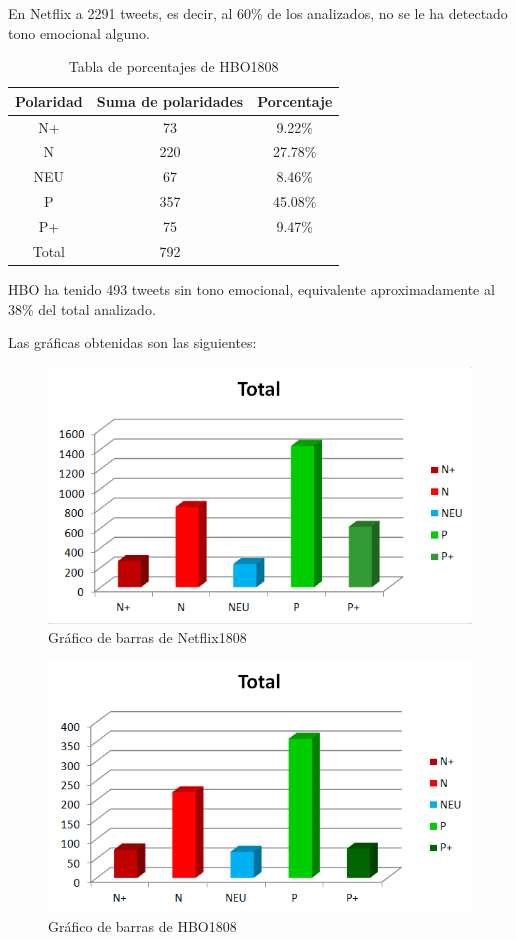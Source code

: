 En Netflix a 2291 tweets, es decir, al 60\% de los analizados, no se le ha detectado tono emocional alguno. 

\begin{table}[H]
	\centering
	\begin{tabular}{|c|c|c|}
		\hline 
		Polaridad& Suma de polaridades & Porcentaje \\ 
		\hline 
		N+& 73 & 9.22\% \\ 
		\hline 
		N& 220 &  27.78\%\\ 
		\hline 
		NEU& 67 & 8.46\% \\ 
		\hline 
		P& 357 &45.08\% \\ 
		\hline 
		P+& 75 & 9.47\% \\ 
		\hline 
		Total & 792 & \\
		\hline
	\end{tabular} 
	\caption{Tabla de porcentajes de HBO1808}
	\label{tbl:porcentaje-HBO1808}
\end{table}
HBO ha tenido 493 tweets sin tono emocional, equivalente aproximadamente al 38\% del total analizado. 


Las gráficas obtenidas son las siguientes: 

\begin{figure}[H]
	\centering
	\includegraphics[scale=.3]{imagenes/barrasNetflix1808.PNG}
	\caption{Gráfico de barras de Netflix1808}
	\label{fig:barrasNetflix1808}
\end{figure}



\begin{figure}[H]
	\centering
	\includegraphics[scale=.3]{imagenes/barrasHBO1808.PNG}
	\caption{Gráfico de barras de HBO1808}
	\label{fig:barrasHBO1808}
\end{figure}


